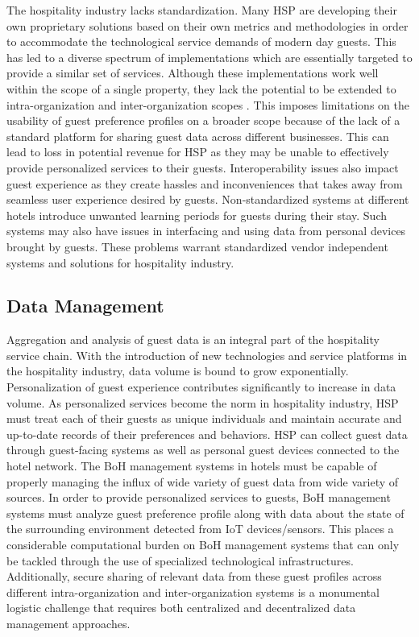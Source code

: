 \documentclass[10pt,journal,letterpaper]{IEEEtran}
\begin{document}
{The hospitality industry lacks standardization. Many HSP are developing their own proprietary solutions based on their own metrics and methodologies in order to accommodate the technological service demands of modern day guests\cite{SpecialNodes_HospitalityIoT_2013}. This has led to a diverse spectrum of implementations which are essentially targeted to provide a similar set of services. Although these implementations work well within the scope of a single property, they lack the potential to be extended to intra-organization and inter-organization scopes \cite{Wood_Hospitality_2013}. This imposes limitations on the usability of guest preference profiles on a broader scope because of the lack of a standard platform for sharing guest data across different businesses. This can lead to loss in potential revenue for HSP as they may be unable to effectively provide personalized services to their guests. Interoperability issues also impact guest experience as they create hassles and inconveniences that takes away from seamless user experience desired by guests. Non-standardized systems at different hotels introduce unwanted learning periods for guests during their stay. Such systems may also have issues in interfacing and using data from personal devices brought by guests. These problems warrant standardized vendor independent systems and solutions for hospitality industry.


\subsection*{Data Management}

Aggregation and analysis of guest data is an integral part of the hospitality service chain. With the introduction of new technologies and service platforms in the hospitality industry, data volume is bound to grow exponentially. Personalization of guest experience contributes significantly to increase in data volume. As personalized services become the norm in hospitality industry, HSP must treat each of their guests as unique individuals and maintain accurate and up-to-date records of their preferences and behaviors. HSP can collect guest data through guest-facing systems as well as personal guest devices connected to the hotel network. The BoH management systems in hotels must be capable of properly managing the influx of wide variety of guest data from wide variety of sources. In order to provide personalized services to guests, BoH management systems must analyze guest preference profile along with data about the state of the surrounding environment detected from IoT devices/sensors. This places a considerable computational burden on BoH management systems that can only be tackled through the use of specialized technological infrastructures. Additionally, secure sharing of relevant data from these guest profiles across different intra-organization and inter-organization systems is a monumental logistic challenge that requires both centralized and decentralized data management approaches.

}
\end{document}

